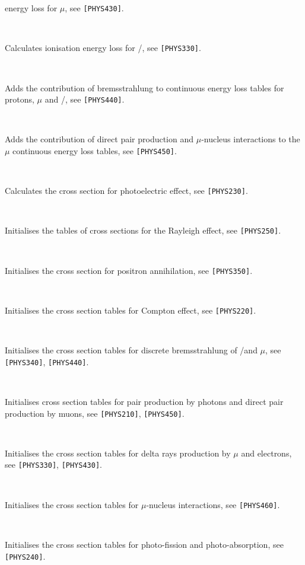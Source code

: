 \begin{tabbing}
{energy loss for $\mu$, see {\tt [PHYS430]}.} \rule{0cm}{.45cm} \\
 \> \>     \> \> \parbox[t]{10cm}{Calculates ionisation
energy loss for \Pem/\Pep, see {\tt [PHYS330]}.} \rule{0cm}{.45cm} \\
 \>     \> \> \> \parbox[t]{10cm}{Adds the contribution of
bremsstrahlung to continuous energy loss tables for protons, $\mu$
and \Pem/\Pep, see {\tt [PHYS440]}.} \rule{0cm}{.45cm} \\
 \>     \> \> \> \parbox[t]{10cm}{Adds the contribution
of direct pair production and $\mu$-nucleus interactions to the
$\mu$ continuous energy loss tables, see {\tt [PHYS450]}.} \rule{0cm}{.45cm} \\
 \>     \> \> \> \parbox[t]{10cm}{Calculates the
cross section for photoelectric effect, see {\tt [PHYS230]}.}\rule{0cm}{.45cm}\\
 \>     \> \> \> \parbox[t]{10cm}{Initialises the tables
of cross sections for the Rayleigh effect, see {\tt [PHYS250]}.} 
\rule{0cm}{.45cm} \\
 \>     \> \> \> \parbox[t]{10cm}{Initialises the cross 
section for positron annihilation, see {\tt [PHYS350]}.} \rule{0cm}{.45cm} \\
 \>     \> \> \> \parbox[t]{10cm}{Initialises the cross section 
tables for Compton effect, see {\tt [PHYS220]}.} \rule{0cm}{.45cm} \\
 \>     \> \> \> \parbox[t]{10cm}{Initialises the cross
section tables for discrete bremsstrahlung of \Pem/\Pep and
$\mu$, see {\tt [PHYS340]}, {\tt [PHYS440]}.} \rule{0cm}{.45cm} \\
 \>     \> \> \> \parbox[t]{10cm}{Initialises cross
section tables for pair production by photons and direct
pair production by muons, see {\tt [PHYS210]}, {\tt [PHYS450]}.} 
\rule{0cm}{.45cm} \\
 \>     \> \> \> \parbox[t]{10cm}{Initialises the
cross section tables for delta rays production by $\mu$ and
electrons, see {\tt [PHYS330]}, {\tt [PHYS430]}.} \rule{0cm}{.45cm} \\
 \>     \> \> \> \parbox[t]{10cm}{Initialises the cross section
tables for $\mu$-nucleus interactions, see {\tt [PHYS460]}.} 
\rule{0cm}{.45cm} \\
 \>     \> \> \> \parbox[t]{10cm}{Initialises the cross section
tables for photo-fission and photo-absorption, see {\tt [PHYS240]}.} 
\rule{0cm}{.45cm} \\

\end{tabbing}
